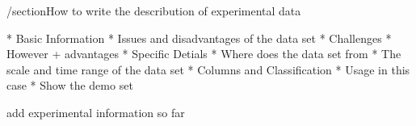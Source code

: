 /section{How to write the describution of experimental data}

* Basic Information
* Issues and disadvantages of the data set
* Challenges
* However + advantages
* Specific Detials
    * Where does the data set from
    * The scale and time range of the data set
    * Columns and Classification
* Usage in this case
* Show the demo set

add experimental information so far
